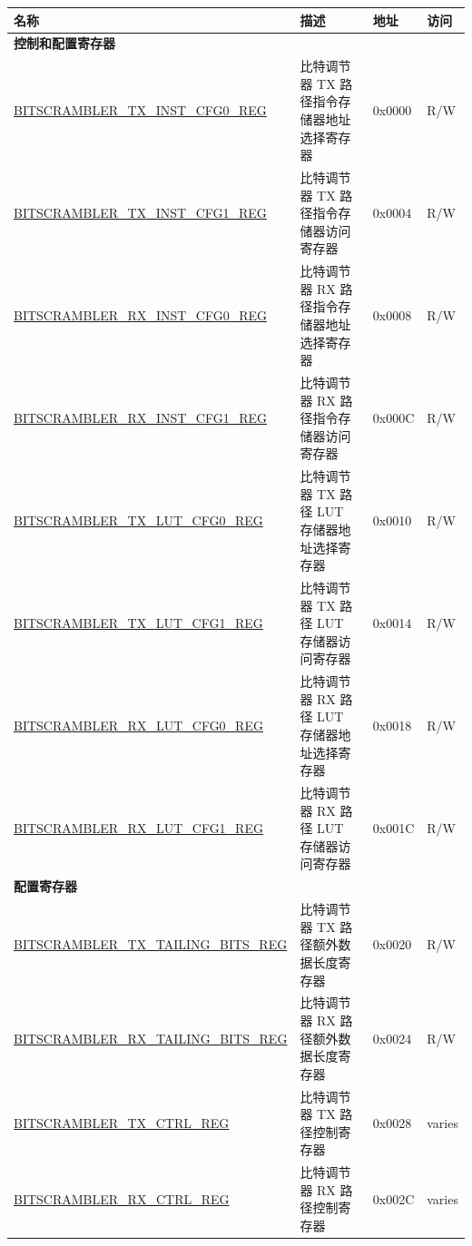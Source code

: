\begin{longtable}{ | p{6.3cm} | p{7cm} | p{1.2cm} | p{1cm} | }
\hline\rowcolor{lightgray}
名称 & 描述 & 地址 & 访问\\ \hline
\endhead
\multicolumn{4}{|l|}{\textbf{控制和配置寄存器}} \\ \hline
\hyperref[regdesc:BITSCRAMBLERTXINSTCFG0REG]{BITSCRAMBLER\_TX\_INST\_CFG0\_REG} & 比特调节器 TX 路径指令存储器地址选择寄存器 & 0x0000 & R/W \\ \hline
\hyperref[regdesc:BITSCRAMBLERTXINSTCFG1REG]{BITSCRAMBLER\_TX\_INST\_CFG1\_REG} & 比特调节器 TX 路径指令存储器访问寄存器 & 0x0004 & R/W \\ \hline
\hyperref[regdesc:BITSCRAMBLERRXINSTCFG0REG]{BITSCRAMBLER\_RX\_INST\_CFG0\_REG} & 比特调节器 RX 路径指令存储器地址选择寄存器 & 0x0008 & R/W \\ \hline
\hyperref[regdesc:BITSCRAMBLERRXINSTCFG1REG]{BITSCRAMBLER\_RX\_INST\_CFG1\_REG} & 比特调节器 RX 路径指令存储器访问寄存器 & 0x000C & R/W \\ \hline
\hyperref[regdesc:BITSCRAMBLERTXLUTCFG0REG]{BITSCRAMBLER\_TX\_LUT\_CFG0\_REG} & 比特调节器 TX 路径 LUT 存储器地址选择寄存器 & 0x0010 & R/W \\ \hline
\hyperref[regdesc:BITSCRAMBLERTXLUTCFG1REG]{BITSCRAMBLER\_TX\_LUT\_CFG1\_REG} & 比特调节器 TX 路径 LUT 存储器访问寄存器 & 0x0014 & R/W \\ \hline
\hyperref[regdesc:BITSCRAMBLERRXLUTCFG0REG]{BITSCRAMBLER\_RX\_LUT\_CFG0\_REG} & 比特调节器 RX 路径 LUT 存储器地址选择寄存器 & 0x0018 & R/W \\ \hline
\hyperref[regdesc:BITSCRAMBLERRXLUTCFG1REG]{BITSCRAMBLER\_RX\_LUT\_CFG1\_REG} & 比特调节器 RX 路径 LUT 存储器访问寄存器 & 0x001C & R/W \\ \hline
\multicolumn{4}{|l|}{\textbf{配置寄存器}} \\ \hline
\hyperref[regdesc:BITSCRAMBLERTXTAILINGBITSREG]{BITSCRAMBLER\_TX\_TAILING\_BITS\_REG} & 比特调节器 TX 路径额外数据长度寄存器 & 0x0020 & R/W \\ \hline
\hyperref[regdesc:BITSCRAMBLERRXTAILINGBITSREG]{BITSCRAMBLER\_RX\_TAILING\_BITS\_REG} & 比特调节器 RX 路径额外数据长度寄存器 & 0x0024 & R/W \\ \hline
\hyperref[regdesc:BITSCRAMBLERTXCTRLREG]{BITSCRAMBLER\_TX\_CTRL\_REG} & 比特调节器 TX 路径控制寄存器 & 0x0028 & varies \\ \hline
\hyperref[regdesc:BITSCRAMBLERRXCTRLREG]{BITSCRAMBLER\_RX\_CTRL\_REG} & 比特调节器 RX 路径控制寄存器 & 0x002C & varies \\ \hline

\end{longtable}
